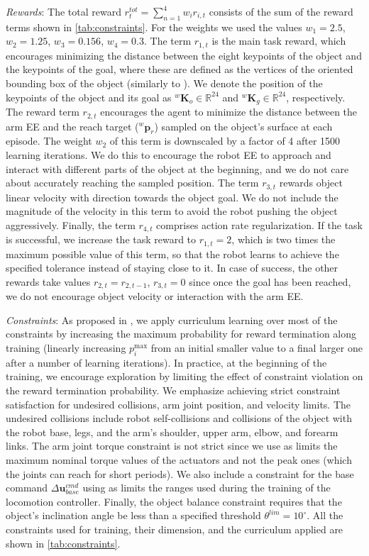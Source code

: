 \textit{Rewards}: The total reward $r_t^{tot} = \sum_{n=1}^{4} w_i r_{i,t}$ consists of the sum of the reward terms shown in \cref{tab:constraints}. For the weights we used the values $w_1 = 2.5$, $w_2 = 1.25$, $w_3 = 0.156$, $w_4 = 0.3$. The term $r_{1,t}$ is the main task reward, which encourages minimizing the distance between the eight keypoints of the object and the keypoints of the goal, where these are defined as the vertices of the oriented bounding box of the object (similarly to \cite{allshire_trifinger, quadruped_pushing}). We denote the position of the keypoints of the object and its goal as $^w\pmb K_o \in \mathbb{R}^{24}$ and $^w\pmb K_g \in \mathbb{R}^{24}$, respectively. The reward term $r_{2,t}$ encourages the agent to minimize the distance between the arm EE and the reach target ($^w\pmb p_r$) sampled on the object's surface at each episode. The weight $w_2$ of this term is downscaled by a factor of 4 after 1500 learning iterations. We do this to encourage the robot EE to approach and interact with different parts of the object at the beginning, and we do not care about accurately reaching the sampled position. The term $r_{3,t}$ rewards object linear velocity with direction towards the object goal. We do not include the magnitude of the velocity in this term to avoid the robot pushing the object aggressively. Finally, the term $r_{4,t}$ comprises action rate regularization. If the task is successful, we increase the task reward to $r_{1,t}=2$, which is two times the maximum possible value of this term, so that the robot learns to achieve the specified tolerance instead of staying close to it. In case of success, the other rewards take values $r_{2,t}=r_{2,t-1}$, $r_{3,t}=0$ since once the goal has been reached, we do not encourage object velocity or interaction with the arm EE.
 
\textit{Constraints}: As proposed in \cite{chanesane2024cat}, we apply curriculum learning over most of the constraints by increasing the maximum probability for reward termination along training (linearly increasing $p_i^\text{max}$ from an initial smaller value to a final larger one after a number of learning iterations). In practice, at the beginning of the training, we encourage exploration by limiting the effect of constraint violation on the reward termination probability. We emphasize achieving strict constraint satisfaction for undesired collisions, arm joint position, and velocity limits. The undesired collisions include robot self-collisions and collisions of the object with the robot base, legs, and the arm's shoulder, upper arm, elbow, and forearm links. The arm joint torque constraint is not strict since we use as limits the maximum nominal torque values of the actuators and not the peak ones (which the joints can reach for short periods). We also include a constraint for the base command $\Delta \pmb u_{base}^{cmd}$ using as limits the ranges used during the training of the locomotion controller. Finally, the object balance constraint requires that the object's inclination angle be less than a specified threshold $\theta^{lim}=10^{\circ}$. All the constraints used for training, their dimension, and the curriculum applied are shown in \cref{tab:constraints}. 

